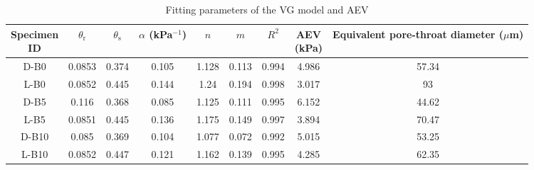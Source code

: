 \begin{table}[htbp]
    \centering
    \caption{Fitting parameters of the VG model and \ac{AEV}}
    \label{tab:ch3_vg_fitting_parameters}
    \begingroup
    \scriptsize
    \renewcommand{\arraystretch}{1.15}
    \setlength{\tabcolsep}{2pt}
    \begin{tabular*}{\textwidth}{@{\extracolsep{\fill}}ccccccccc@{}}
        \toprule
        \makecell[c]{Specimen\\ID} & $\theta_{\mathrm{r}}$ & $\theta_{\mathrm{s}}$ & \makecell[c]{$\alpha$\\(kPa$^{-1}$)} & $n$ & $m$ & $R^2$ & \makecell[c]{AEV\\(kPa)} & \makecell[c]{Equivalent pore-throat\\diameter ($\mu$m)} \\
        \midrule
        D-B0  & 0.0853 & 0.374 & 0.105 & 1.128 & 0.113 & 0.994 & 4.986 & 57.34 \\
        L-B0  & 0.0852 & 0.445 & 0.144 & 1.24  & 0.194 & 0.998 & 3.017 & 93 \\
        D-B5  & 0.116  & 0.368 & 0.085 & 1.125 & 0.111 & 0.995 & 6.152 & 44.62 \\
        L-B5  & 0.0851 & 0.445 & 0.136 & 1.175 & 0.149 & 0.997 & 3.894 & 70.47 \\
        D-B10 & 0.085  & 0.369 & 0.104 & 1.077 & 0.072 & 0.992 & 5.015 & 53.25 \\
        L-B10 & 0.0852 & 0.447 & 0.121 & 1.162 & 0.139 & 0.995 & 4.285 & 62.35 \\
        \bottomrule
    \end{tabular*}
    \endgroup
\end{table}

